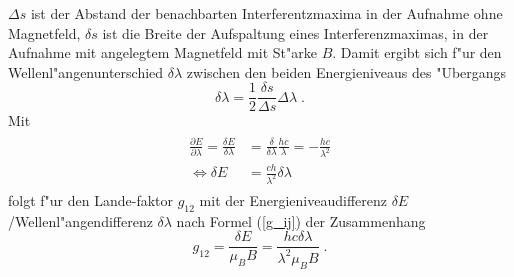   $\Delta s$ ist der Abstand der benachbarten Interferentzmaxima in der Aufnahme ohne Magnetfeld, $\delta s$ ist die Breite der Aufspaltung eines Interferenzmaximas, in der Aufnahme mit angelegtem Magnetfeld mit St"arke $B$.
  Damit ergibt sich f"ur den Wellenl"angenunterschied $\delta \lambda$ zwischen den beiden Energieniveaus des "Ubergangs
  \begin{equation}
    \delta \lambda = \frac{1}{2}\frac{\delta s}{\Delta s} \Delta \lambda \; .
  \end{equation}
  Mit
  \begin{align}
    \begin{split}
    \frac{\partial E}{\partial \lambda} = \frac{\delta E}{\delta \lambda} &= \frac{\delta}{\delta \lambda} \frac{hc}{\lambda} = -\frac{hc}{\lambda^2}\\
    \iff \delta E &= \frac{ch}{\lambda^2} \delta \lambda
   \end{split}
  \end{align}
  folgt f"ur den Lande-faktor $g_{12}$ mit der Energieniveaudifferenz $\delta E$/Wellenl"angendifferenz $\delta \lambda$ nach Formel (\ref{g_ij}) der Zusammenhang
  \begin{equation}
    g_{12}=\frac{\delta E}{\mu_BB}=\frac{hc\delta \lambda}{\lambda^2\mu_BB} \; .
  \end{equation}




















